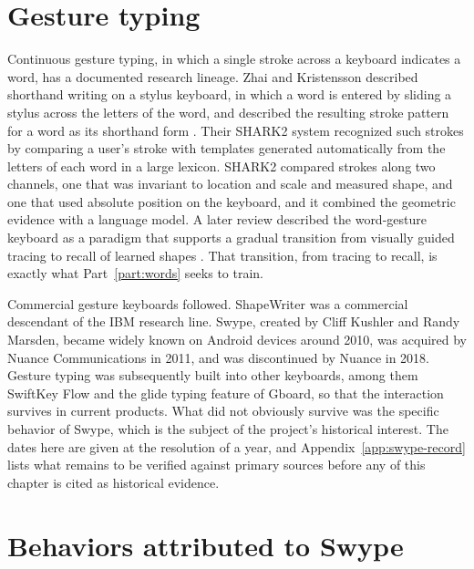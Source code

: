 \section{Gesture typing}

Continuous gesture typing, in which a single stroke across a keyboard indicates a word, has a documented research lineage. Zhai and Kristensson described shorthand writing on a stylus keyboard, in which a word is entered by sliding a stylus across the letters of the word, and described the resulting stroke pattern for a word as its shorthand form \cite{zhai2003shorthand}.\evD{} Their SHARK2 system \cite{kristensson2004shark2}\evD{} recognized such strokes by comparing a user's stroke with templates generated automatically from the letters of each word in a large lexicon. SHARK2 compared strokes along two channels, one that was invariant to location and scale and measured shape, and one that used absolute position on the keyboard, and it combined the geometric evidence with a language model. A later review described the word-gesture keyboard as a paradigm that supports a gradual transition from visually guided tracing to recall of learned shapes \cite{zhai2012wordgesture}.\evD{} That transition, from tracing to recall, is exactly what Part~\ref{part:words} seeks to train.

Commercial gesture keyboards followed. ShapeWriter was a commercial descendant of the IBM research line. Swype, created by Cliff Kushler and Randy Marsden, became widely known on Android devices around 2010, was acquired by Nuance Communications in 2011, and was discontinued by Nuance in 2018.\evD{} Gesture typing was subsequently built into other keyboards, among them SwiftKey Flow and the glide typing feature of Gboard, so that the interaction survives in current products. What did not obviously survive was the specific behavior of Swype, which is the subject of the project's historical interest. The dates here are given at the resolution of a year, and Appendix~\ref{app:swype-record} lists what remains to be verified against primary sources before any of this chapter is cited as historical evidence.

\section{Behaviors attributed to Swype}

